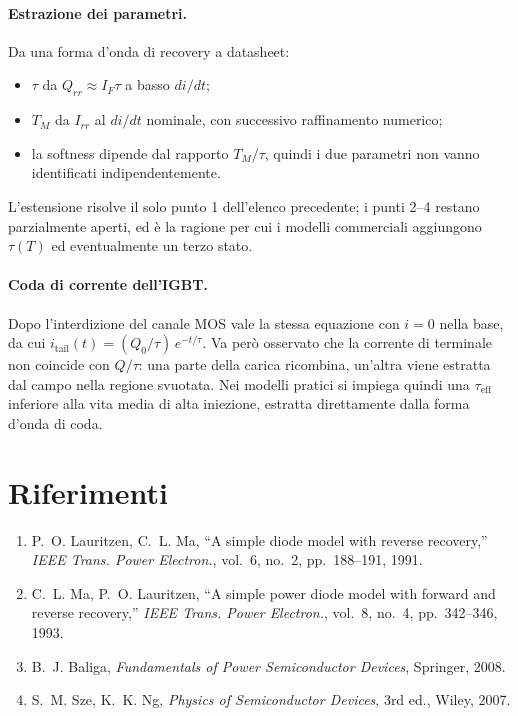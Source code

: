 \documentclass[11pt,a4paper]{article}
\begin{document}
\paragraph{Estrazione dei parametri.} Da una forma d'onda di recovery a datasheet:
\begin{itemize}
  \item $\tau$ da $Q_{rr} \approx I_F \tau$ a basso $di/dt$;
  \item $T_M$ da $I_{rr}$ al $di/dt$ nominale, con successivo raffinamento numerico;
  \item la softness dipende dal rapporto $T_M/\tau$, quindi i due parametri non vanno
        identificati indipendentemente.
\end{itemize}

L'estensione risolve il solo punto 1 dell'elenco precedente; i punti 2--4 restano
parzialmente aperti, ed \`e la ragione per cui i modelli commerciali aggiungono
$\tau(T)$ ed eventualmente un terzo stato.

\paragraph{Coda di corrente dell'IGBT.} Dopo l'interdizione del canale MOS vale la
stessa equazione con $i = 0$ nella base, da cui
$i_{\text{tail}}(t) = (Q_0/\tau)\,e^{-t/\tau}$. Va per\`o osservato che la corrente di
terminale non coincide con $Q/\tau$: una parte della carica ricombina, un'altra viene
estratta dal campo nella regione svuotata. Nei modelli pratici si impiega quindi una
$\tau_{\text{eff}}$ inferiore alla vita media di alta iniezione, estratta direttamente
dalla forma d'onda di coda.

\section*{Riferimenti}

\begin{enumerate}
  \item P.~O. Lauritzen, C.~L. Ma, ``A simple diode model with reverse recovery,''
        \emph{IEEE Trans. Power Electron.}, vol.~6, no.~2, pp.~188--191, 1991.
  \item C.~L. Ma, P.~O. Lauritzen, ``A simple power diode model with forward and
        reverse recovery,'' \emph{IEEE Trans. Power Electron.}, vol.~8, no.~4,
        pp.~342--346, 1993.
  \item B.~J. Baliga, \emph{Fundamentals of Power Semiconductor Devices}, Springer,
        2008.
  \item S.~M. Sze, K.~K. Ng, \emph{Physics of Semiconductor Devices}, 3rd ed., Wiley,
        2007.
\end{enumerate}
\end{document}
